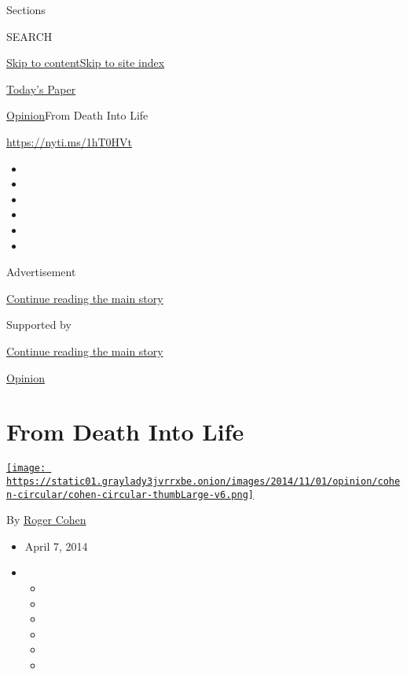 Sections

SEARCH

\protect\hyperlink{site-content}{Skip to
content}\protect\hyperlink{site-index}{Skip to site index}

\href{https://myaccount.nytimes3xbfgragh.onion/auth/login?response_type=cookie\&client_id=vi}{}

\href{https://www.nytimes3xbfgragh.onion/section/todayspaper}{Today's
Paper}

\href{/section/opinion}{Opinion}\textbar{}From Death Into Life

\url{https://nyti.ms/1hT0HVt}

\begin{itemize}
\item
\item
\item
\item
\item
\item
\end{itemize}

Advertisement

\protect\hyperlink{after-top}{Continue reading the main story}

Supported by

\protect\hyperlink{after-sponsor}{Continue reading the main story}

\href{/section/opinion}{Opinion}

\hypertarget{from-death-into-life}{%
\section{From Death Into Life}\label{from-death-into-life}}

\href{https://www.nytimes3xbfgragh.onion/by/roger-cohen}{\texttt{[image: https://static01.graylady3jvrrxbe.onion/images/2014/11/01/opinion/cohen-circular/cohen-circular-thumbLarge-v6.png]}}

By \href{https://www.nytimes3xbfgragh.onion/by/roger-cohen}{Roger Cohen}

\begin{itemize}
\item
  April 7, 2014
\item
  \begin{itemize}
  \item
  \item
  \item
  \item
  \item
  \item
  \end{itemize}
\end{itemize}

